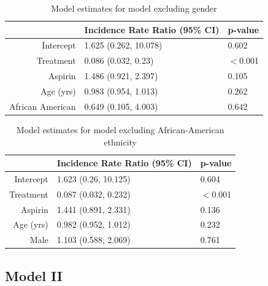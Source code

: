 \documentclass[paper=a4, fontsize=11pt]{scrartcl} %
\numberwithin{equation}{section} %
\numberwithin{figure}{section} %
\numberwithin{table}{section} %
\begin{document}
\begin{table}[H]
\centering
\caption{Model estimates for model excluding gender}
\begin{tabular}{rll}
  \hline
 & Incidence Rate Ratio (95\% CI) & p-value \\ 
  \hline
Intercept & 1.625 (0.262, 10.078) & 0.602 \\ 
  Treatment & 0.086 (0.032, 0.23) & $<$0.001 \\ 
  Aspirin & 1.486 (0.921, 2.397) & 0.105 \\ 
  Age (yrs) & 0.983 (0.954, 1.013) & 0.262 \\ 
  African American & 0.649 (0.105, 4.003) & 0.642 \\ 
   \hline
\end{tabular}
\end{table}

\begin{table}[H]
\centering
\caption{Model estimates for model excluding African-American ethnicity}
\begin{tabular}{rll}
  \hline
 & Incidence Rate Ratio (95\% CI) & p-value \\ 
  \hline
Intercept & 1.623 (0.26, 10.125) & 0.604 \\ 
  Treatment & 0.087 (0.032, 0.232) & $<$0.001 \\ 
  Aspirin & 1.441 (0.891, 2.331) & 0.136 \\ 
  Age (yrs) & 0.982 (0.952, 1.012) & 0.232 \\ 
  Male & 1.103 (0.588, 2.069) & 0.761 \\ 
   \hline
\end{tabular}
\end{table}


\subsection{Model II}
\label{sec:model_ii_app}
\end{document}
